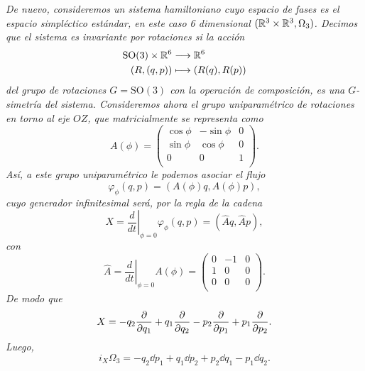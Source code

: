 \begin{ejemplo}
  \em
  De nuevo, consideremos un sistema hamiltoniano cuyo espacio de fases es el espacio simpléctico estándar, en este caso 6 dimensional $(\mathbb{R}^{3}\times \mathbb{R}^3,\Omega_3)$. Decimos que el sistema es \emph{invariante por rotaciones} si la acción
  \begin{align*}
    \mathrm{SO}(3) \times \mathbb{R}^{6}&\longrightarrow \mathbb{R}^{6}\\ 
      (R,(q,p)) &\longmapsto (R(q),R(p)) 
    \end{align*}
    del grupo de rotaciones $G=\mathrm{SO}(3)$ con la operación de composición, es una $G$-simetría del sistema. Consideremos ahora el grupo uniparamétrico de rotaciones en torno al eje $OZ$, que matricialmente se representa como
    \begin{equation*}
      A(\phi)=\left(
      \begin{array}{ccc}
	\cos\phi & -\sin\phi & 0 \\
	\sin\phi & \cos\phi & 0 \\
	0 & 0 & 1 \\
      \end{array}\right).
    \end{equation*}
    Así, a este grupo uniparamétrico le podemos asociar el flujo
    \begin{equation*}
      \varphi_{\phi}(q,p)=(A(\phi)q,A(\phi)p),
    \end{equation*}
    cuyo generador infinitesimal será, por la regla de la cadena
    \begin{equation*}
      X=\left.\frac{d}{dt}\right|_{\phi=0}\varphi_{\phi}(q,p)=(\hat{A}q,\hat{A}p),
    \end{equation*}
    con 
    \begin{equation*}
      \hat{A}=\left.\frac{d}{dt}\right|_{\phi=0}A(\phi)=\left(
      \begin{array}{ccc}
	0 & -1 & 0 \\
	1 & 0 & 0 \\
	0 & 0 & 0 \\
      \end{array}\right).
    \end{equation*}
    De modo que 
    \begin{equation*}
      X=-q_2\frac{\partial}{\partial q_1}+q_1\frac{\partial}{\partial q_2}-p_2\frac{\partial}{\partial p_1}+p_1\frac{\partial}{\partial p_2}.
    \end{equation*}
    Luego,
    \begin{equation*}
      i_X\Omega_3=-q_2\dd p_1+q_1\dd p_2 +p_2 \dd q_1 - p_1 \dd q_2.
    \end{equation*}


\end{ejemplo}
